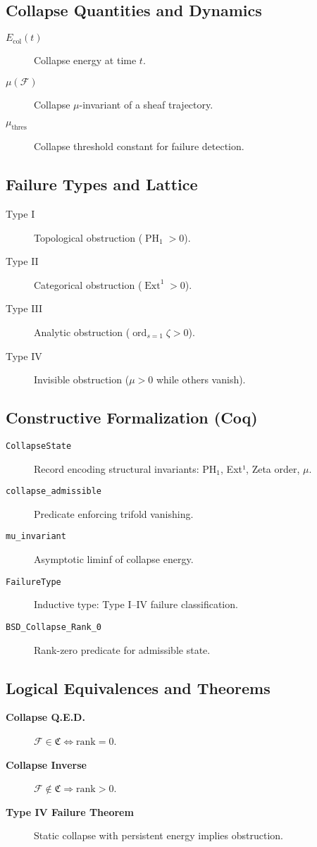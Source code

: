 \documentclass[11pt]{article}
\DeclareMathOperator{\Ext}{Ext}
\DeclareMathOperator{\PH}{PH}
\newcommand{\ord}{\operatorname{ord}}
\begin{document}
\subsection*{Collapse Quantities and Dynamics}
\begin{description}
  \item[$E_{\mathrm{col}}(t)$] Collapse energy at time \( t \).
  \item[$\mu(\mathcal{F})$] Collapse \(\mu\)-invariant of a sheaf trajectory.
  \item[$\mu_{\mathrm{thres}}$] Collapse threshold constant for failure detection.
\end{description}

\subsection*{Failure Types and Lattice}
\begin{description}
  \item[Type I] Topological obstruction (\( \PH_1 > 0 \)).
  \item[Type II] Categorical obstruction (\( \Ext^1 > 0 \)).
  \item[Type III] Analytic obstruction (\( \ord_{s=1} \zeta > 0 \)).
  \item[Type IV] Invisible obstruction (\( \mu > 0 \) while others vanish).
\end{description}

\subsection*{Constructive Formalization (Coq)}
\begin{description}
  \item[\texttt{CollapseState}] Record encoding structural invariants: \( \mathrm{PH}_1 \), Ext¹, Zeta order, \(\mu\).
  \item[\texttt{collapse\_admissible}] Predicate enforcing trifold vanishing.
  \item[\texttt{mu\_invariant}] Asymptotic liminf of collapse energy.
  \item[\texttt{FailureType}] Inductive type: Type I–IV failure classification.
  \item[\texttt{BSD\_Collapse\_Rank\_0}] Rank-zero predicate for admissible state.
\end{description}

\subsection*{Logical Equivalences and Theorems}
\begin{description}
  \item[\textbf{Collapse Q.E.D.}] \( \mathcal{F} \in \mathfrak{C} \iff \mathrm{rank} = 0 \).
  \item[\textbf{Collapse Inverse}] \( \mathcal{F} \notin \mathfrak{C} \Rightarrow \mathrm{rank} > 0 \).
  \item[\textbf{Type IV Failure Theorem}] Static collapse with persistent energy implies obstruction.
\end{description}
\end{document}
